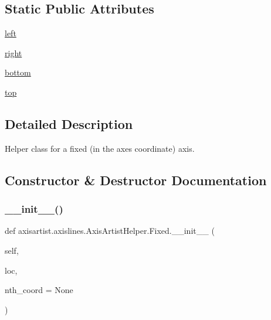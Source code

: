 \subsection*{Static Public Attributes}
\begin{DoxyCompactItemize}
\item 
\hyperlink{classaxisartist_1_1axislines_1_1AxisArtistHelper_1_1Fixed_aea9e0a0d8fb37724fd300e00563c3069}{left}
\item 
\hyperlink{classaxisartist_1_1axislines_1_1AxisArtistHelper_1_1Fixed_a4a356181829f54f27a40732504e07d4d}{right}
\item 
\hyperlink{classaxisartist_1_1axislines_1_1AxisArtistHelper_1_1Fixed_a25686048632d8fe9be050f57f53cef58}{bottom}
\item 
\hyperlink{classaxisartist_1_1axislines_1_1AxisArtistHelper_1_1Fixed_a25eaf8a93d525fdb118938f56b53be11}{top}
\end{DoxyCompactItemize}


\subsection{Detailed Description}
\begin{DoxyVerb}Helper class for a fixed (in the axes coordinate) axis.\end{DoxyVerb}
 

\subsection{Constructor \& Destructor Documentation}
\mbox{\label{classaxisartist_1_1axislines_1_1AxisArtistHelper_1_1Fixed_a70d792fea132744c0934fa974ad54170}} 
\subsubsection{\texorpdfstring{\+\_\+\+\_\+init\+\_\+\+\_\+()}{\_\_init\_\_()}}
{\footnotesize\ttfamily def axisartist.\+axislines.\+Axis\+Artist\+Helper.\+Fixed.\+\_\+\+\_\+init\+\_\+\+\_\+ (\begin{DoxyParamCaption}\item[{}]{self,  }\item[{}]{loc,  }\item[{}]{nth\+\_\+coord = {\ttfamily None} }\end{DoxyParamCaption})}

